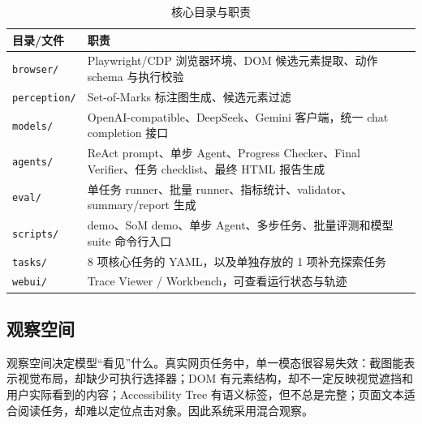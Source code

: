 \begin{table}[H]
  \centering
  \caption{核心目录与职责}
  \label{tab:repo-modules}
  \small
  \begin{tabularx}{\textwidth}{p{}Y}
    \toprule
    目录/文件 & 职责 \\
    \midrule
    \texttt{browser/} & Playwright/CDP 浏览器环境、DOM 候选元素提取、动作 schema 与执行校验 \\
    \texttt{perception/} & Set-of-Marks 标注图生成、候选元素过滤 \\
    \texttt{models/} & OpenAI-compatible、DeepSeek、Gemini 客户端，统一 chat completion 接口 \\
    \texttt{agents/} & ReAct prompt、单步 Agent、Progress Checker、Final Verifier、任务 checklist、最终 HTML 报告生成 \\
    \texttt{eval/} & 单任务 runner、批量 runner、指标统计、validator、summary/report 生成 \\
    \texttt{scripts/} & demo、SoM demo、单步 Agent、多步任务、批量评测和模型 suite 命令行入口 \\
    \texttt{tasks/} & 8 项核心任务的 YAML，以及单独存放的 1 项补充探索任务 \\
    \texttt{webui/} & Trace Viewer / Workbench，可查看运行状态与轨迹 \\
    \bottomrule
  \end{tabularx}
\end{table}

\subsection{观察空间}

观察空间决定模型“看见”什么。真实网页任务中，单一模态很容易失效：截图能表示视觉布局，却缺少可执行选择器；DOM 有元素结构，却不一定反映视觉遮挡和用户实际看到的内容；Accessibility Tree 有语义标签，但不总是完整；页面文本适合阅读任务，却难以定位点击对象。因此系统采用混合观察。

